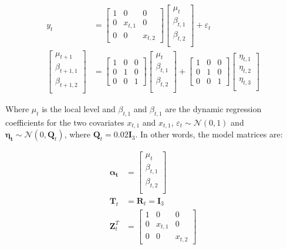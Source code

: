 \documentclass[12pt]{article}
\begin{document}
\begin{align}
y_t &= \begin{bmatrix} \label{q1}
1 & 0 & 0\\
0 & x_{t, 1} & 0\\
0 & 0 & x_{t, 2}
\end{bmatrix} \begin{bmatrix}
\mu_{t} \\
\beta_{t, 1} \\
\beta_{t, 2} \\
\end{bmatrix} +
\varepsilon_{t} \\
\begin{bmatrix} \label{q2}
\mu_{t+1} \\
\beta_{t+1, 1} \\
\beta_{t+1, 2} \\
\end{bmatrix} &=  \begin{bmatrix}
1 & 0 & 0\\
0 & 1 & 0\\
0 & 0 & 1
\end{bmatrix}  \begin{bmatrix}
\mu_{t} \\
\beta_{t, 1} \\
\beta_{t, 2} \\
\end{bmatrix} + \begin{bmatrix}
1 & 0 & 0\\
0 & 1 & 0\\
0 & 0 & 1
\end{bmatrix}  \begin{bmatrix}
\eta_{t, 1} \\
\eta_{t, 2}  \\
\eta_{t, 3}  \\
\end{bmatrix} 
\end{align}

Where $\mu_t$ is the local level and $\beta_{t, 1}$ and   $\beta_{t, 1}$ are the dynamic regression coefficients for the two covariates $x_{t, 1}$ and   $x_{t, 1}$, $\varepsilon_t \sim \mathcal{N}(0, 1)$ and $\boldsymbol{\eta_t} \sim \mathcal{N}(0, \boldsymbol{Q}_t)$, where $\boldsymbol{Q}_t = 0.02 \boldsymbol{I}_{3}$. In other words, the model matrices are:

\begin{align*}
    \boldsymbol{\alpha_t} &= \begin{bmatrix}
\mu_{t} \\
\beta_{t, 1} \\
\beta_{t, 2} \\
\end{bmatrix}\\
\boldsymbol{T}_t &= \boldsymbol{R}_t = \boldsymbol{I}_3\\
\boldsymbol{Z}_t^T &=\begin{bmatrix}
1 & 0 & 0\\
0 & x_{t, 1} & 0\\
0 & 0 & x_{t, 2}
\end{bmatrix} 
\end{align*}
\end{document}

